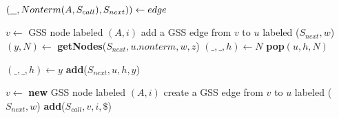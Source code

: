 \begin{algorithmic}    
    \State $(\underline{\hspace{0.25cm}}, Nonterm(A, S_{call}), S_{next})) \gets edge$
    
        \State $v \gets$ GSS node labeled $(A, i)$
            \State add a GSS edge from $v$ to $u$ labeled ($S_{next},w$)
                \State $(y,N) \gets$ \textbf{getNodes}($S_{next}, u.nonterm, w, z$)
                    \State $(\_, \_, h) \gets N$
                    \State \textbf{pop}$(u,h,N)$ 
                \EndIf
                
                    \State $(\_, \_, h) \gets y$
                    \State \textbf{add}($S_{next} , u, h, y$)
                \EndIf
            \EndFor
        \EndIf
    
    \Else
        \State $v \gets$ \textbf{new} GSS node labeled $(A, i)$
        \State create a GSS edge from $v$ to $u$ labeled ($S_{next}, w$)
        \State \textbf{add}($S_{call}, v, i, \$ $)
    \EndIf
\EndFunction
\end{algorithmic}  